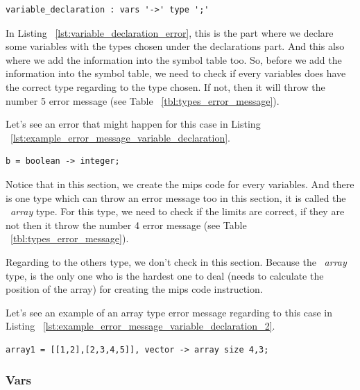 \documentclass[
  oneside,
  11pt, a4paper,
  footinclude=true,
  headinclude=true,
  cleardoublepage=empty
]{scrbook}
\begin{document}
\begin{lstlisting}[label={lst:variable_declaration_error},caption={Variable declaration rule in LISS}]
  variable_declaration : vars '->' type ';'
\end{lstlisting}

In Listing ~\ref{lst:variable_declaration_error}, this is the part where we declare some variables with the types chosen under the declarations part.
And this also where we add the information into the symbol table too.
So, before we add the information into the symbol table, we need to check if every variables does have the correct type regarding to the type chosen. If not, then it will throw the number 5 error message (see Table ~\ref{tbl:types_error_message}).

Let's see an error that might happen for this case in Listing ~\ref{lst:example_error_message_variable_declaration}.

\begin{lstlisting}[label={lst:example_error_message_variable_declaration},caption={Example of an error message in variable declaration}]
  b = boolean -> integer;
\end{lstlisting}

Notice that in this section, we create the mips code for every variables. And there is one type which can throw an error message too in this section, it is called the ~\textit{array} type. For this type, we need to check if the limits are correct, if they are not then it throw the number 4 error message (see Table ~\ref{tbl:types_error_message}).

Regarding to the others type, we don't check in this section. Because the ~\textit{array} type, is the only one who is the hardest one to deal (needs to calculate the position of the array) for creating the mips code instruction.

Let's see an example of an array type error message regarding to this case in Listing ~\ref{lst:example_error_message_variable_declaration_2}.

\begin{lstlisting}[label={lst:example_error_message_variable_declaration_2},caption={Example of an error message in variable declaration for the array type}]
  array1 = [[1,2],[2,3,4,5]], vector -> array size 4,3;
\end{lstlisting}

\subsubsection{Vars}
\end{document}
